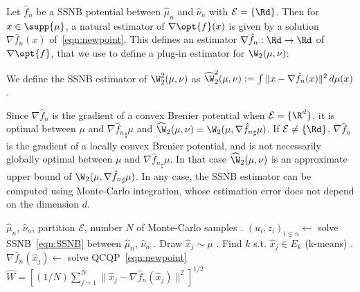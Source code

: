 Let $\hat f_n$ be a SSNB potential between $\hat\mu_n$ and $\hat\nu_n$ with $\mathcal{E}=\{\Rd\}$. Then for $x \in \supp{\mu}$, a natural estimator of $\nabla \opt{f}(x)$ is given by a solution $\nabla \hat f_n(x)$ of~\eqref{eqn:newpoint}. This defines an estimator $\nabla \hat f_n: \Rd \to \Rd$ of $\nabla \opt{f}$, that we use to define a plug-in estimator for $\W_2(\mu,\nu)$:
\begin{definition}
    We define the SSNB estimator of $\W_2^2(\mu,\nu)$ as $\widehat \W_2^2(\mu,\nu) := \int \|x - \nabla \hat f_n(x)\|^2 \,d\mu(x)$.
\end{definition}\vspace{-0.3cm}
Since $\nabla \hat f_n$ is the gradient of a convex Brenier potential when $\mathcal{E}=\{\R^d\}$, it is optimal between $\mu$ and ${\nabla \hat f_n}_\sharp\mu$ and $\widehat \W_2(\mu,\nu) = \W_2(\mu, {\nabla \hat f_n}_\sharp\mu)$. If $\mathcal{E} \neq \{\Rd\}$, $\nabla \hat f_n$ is the gradient of a locally convex Brenier potential, and is not necessarily globally optimal between $\mu$ and ${\nabla \hat f_n}_\sharp\mu$. In that case $\widehat \W_2(\mu,\nu)$ is an approximate upper bound of $\W_2(\mu, {\nabla \hat f_n}_\sharp\mu)$. In any case, the SSNB estimator can be computed using Monte-Carlo integration, whose estimation error does not depend on the dimension $d$.

\begin{algorithm}[!h]
	\caption{Monte-Carlo approximation of the SSNB estimator}
	\begin{algorithmic}
   		 $\hat\mu_n$, $\hat\nu_n$, partition $\mathcal{E}$, number $N$ of Monte-Carlo samples
		\STATE . $(u_i, z_i)_{i\leq n} \leftarrow$ solve SSNB~\eqref{eqn:SSNB} between $\hat\mu_n$, $\hat\nu_n$
		\STATE . Draw $\hat x_j \sim \mu$
        \STATE . Find $k$ s.t. $\hat x_j \in E_k$ (k-means)
        \STATE . $\nabla \hat f_n(\hat x_j) \leftarrow$ solve QCQP~\eqref{eqn:newpoint}
  		\ENDFOR
		 $\widehat W = \left[(1/N)\sum_{j=1}^N \|\hat x_j - \nabla \hat f_n(\hat x_j)\|^2 \right]^{1/2}$
	\end{algorithmic}
\end{algorithm}

